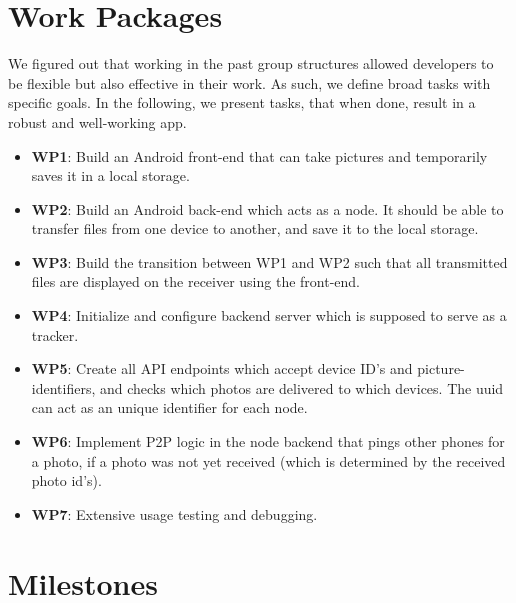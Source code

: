 \documentclass{report}
\begin{document}
\section{Work Packages}
We figured out that working in the past group structures allowed developers to be flexible but also effective in their work. As such, we define broad tasks with specific goals.
In the following, we present tasks, that when done, result in a robust and well-working app.

\begin{itemize}
        \item {\bf WP1}:  Build an Android front-end that can take pictures and temporarily saves it in a local storage.    
        \item {\bf WP2}:  Build an Android back-end which acts as a node. 
        It should be able to transfer files from one device to another, and save it to the local storage.
        \item {\bf WP3}: Build the transition between WP1 and WP2 such that all transmitted files are displayed on the receiver using the front-end.    
        \item {\bf WP4}: Initialize and configure backend server which is supposed to serve as a tracker.    
        \item {\bf WP5}: Create all API endpoints which accept device ID's and picture-identifiers, and checks which photos are delivered to which devices. 
        The uuid can act as an unique identifier for each node.    
        \item {\bf WP6}: Implement P2P logic in the node backend that pings other phones for a photo, if a photo was not yet received (which is determined by the received photo id's). 
        \item {\bf WP7}: Extensive usage testing and debugging.
\end{itemize}
 
\section{Milestones}
\end{document}

